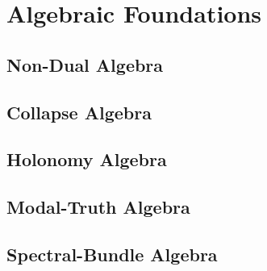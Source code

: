 \section{Algebraic Foundations}
\subsection{Non-Dual Algebra}
\begin{definition}
\end{definition}

\begin{axiom}
\end{axiom}

\subsection{Collapse Algebra}
\begin{definition}
\end{definition}

\begin{axiom}
\end{axiom}

\subsection{Holonomy Algebra}
\begin{definition}
\end{definition}

\begin{axiom}
\end{axiom}

\subsection{Modal-Truth Algebra}
\begin{definition}
\end{definition}

\begin{axiom}
\end{axiom}

\subsection{Spectral-Bundle Algebra}
\begin{definition}
\end{definition}

